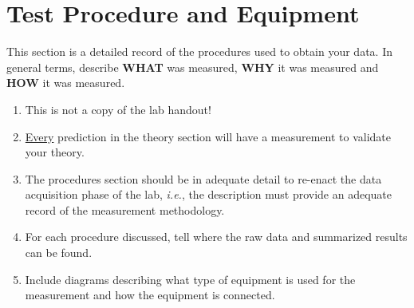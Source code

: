 \section{Test Procedure and Equipment}
This section is a detailed record of the procedures used to obtain your data.  In general terms, describe \textbf{WHAT} was measured, \textbf{WHY} it was measured and \textbf{HOW} it was measured.

\begin{enumerate}
	\item This is not a copy of the lab handout!
	\item \underline{Every} prediction in the theory section will have a measurement to validate your theory.
	\item The procedures section should be in adequate detail to re-enact the data acquisition phase of the lab, \textit{i.e.}, the description must provide an adequate record of the measurement methodology.
	\item For each procedure discussed, tell where the raw data and summarized results can be found.
	\item Include diagrams describing what type of equipment is used for the measurement and how the equipment is connected.
\end{enumerate}